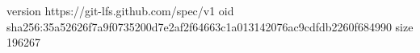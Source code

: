 version https://git-lfs.github.com/spec/v1
oid sha256:35a52626f7a9f0735200d7e2af2f64663c1a013142076ac9cdfdb2260f684990
size 196267
